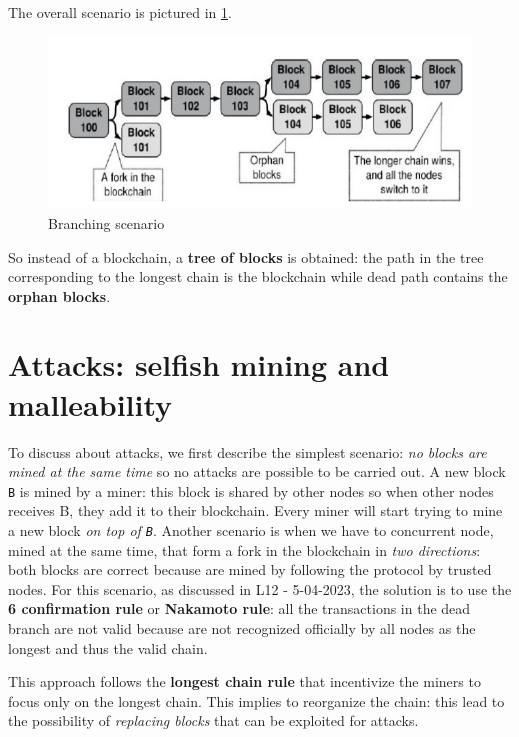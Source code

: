 \documentclass[10pt,a4paper]{report}
\begin{document}
The overall scenario is pictured in \ref{fork-scenario}.
\begin{figure}[h]
	\centering
	\includegraphics[scale=0.50]{images/Pasted image 20230411110417.png}
	\caption{Branching scenario}
	\label{fork-scenario}
\end{figure}

So instead of a blockchain, a \textbf{tree of blocks} is obtained: the path in the tree corresponding to the longest chain is the blockchain while dead path contains the \textbf{orphan blocks}.

\section{Attacks: selfish mining and malleability}\label{sec:attacks-selfish-mining-and-malleability}
To discuss about attacks, we first describe the simplest scenario: \textit{no blocks are mined at the same time} so no attacks are possible to be carried out.
A new block \texttt{B} is mined by a miner: this block is shared by other nodes so when other nodes receives B, they add it to their blockchain. Every miner will start trying to mine a new block \textit{on top of \texttt{B}}.
Another scenario is when we have to concurrent node, mined at the same time, that form a fork in the blockchain in \textit{two directions}: both blocks are correct because are mined by following the protocol by trusted nodes. For this scenario, as discussed in L12 - 5-04-2023, the solution is to use the \textbf{6 confirmation rule} or \textbf{Nakamoto rule}: all the transactions in the dead branch are not valid because are not recognized officially by all nodes as the longest and thus the valid chain.

This approach follows the \textbf{longest chain rule} that incentivize the miners to focus only on the longest chain. This implies to reorganize the chain: this lead to the possibility of \textit{replacing blocks} that can be exploited for attacks.
\end{document}
